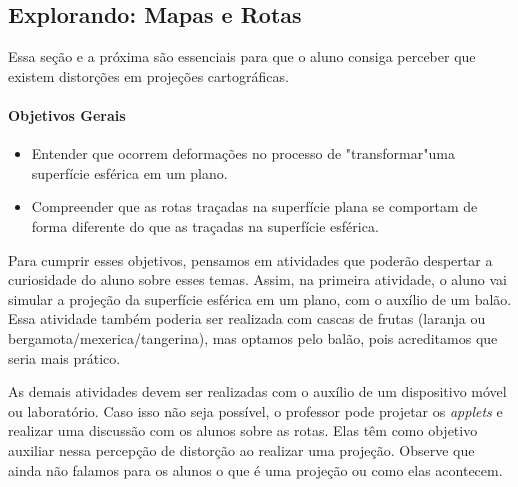 \def\currentcolor{session1}
\begin{texto}{
\subsection{Explorando: Mapas e Rotas}

Essa seção e a próxima são essenciais para que o aluno consiga perceber que existem distorções em projeções cartográficas.

\paragraph{Objetivos Gerais}

\begin{itemize}
\item Entender que ocorrem deformações no processo de  "transformar"{}uma superfície esférica em um plano.

\item Compreender que as rotas traçadas na superfície plana se comportam de forma diferente do que as traçadas na superfície esférica.
\end{itemize}

Para cumprir esses objetivos, pensamos em atividades que poderão despertar a curiosidade do aluno sobre esses temas. Assim, na primeira atividade, o aluno vai simular a projeção da superfície esférica em um plano, com o auxílio de um balão. Essa atividade também poderia ser realizada com cascas de frutas (laranja ou bergamota/mexerica/tangerina), mas optamos pelo balão, pois acreditamos que seria mais prático.

As demais atividades devem ser realizadas com o auxílio de um dispositivo móvel ou laboratório. Caso isso não seja possível, o professor pode projetar os \textit{applets} e realizar uma discussão com os alunos sobre as rotas. Elas têm como objetivo auxiliar nessa percepção de distorção  ao realizar uma projeção. Observe que ainda não falamos para os alunos o que é uma projeção ou como elas acontecem.
}
\end{texto}

